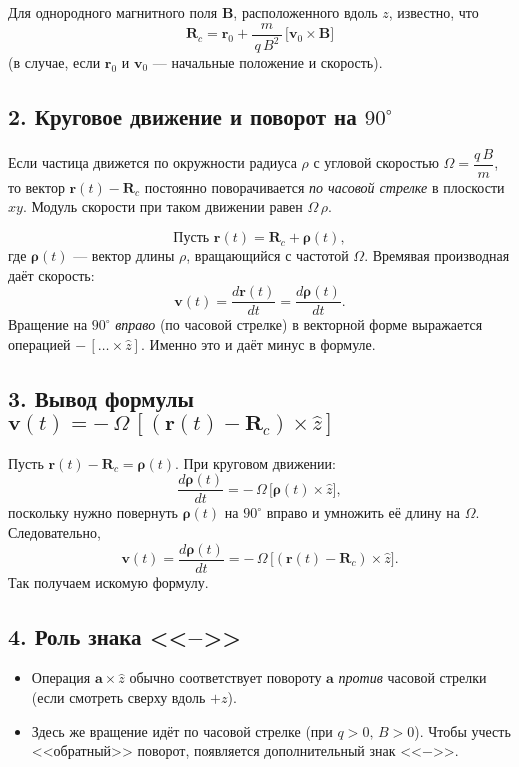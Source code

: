 \documentclass{article}
\begin{document}
Для однородного магнитного поля \(\mathbf{B}\), расположенного вдоль \(z\), известно, что
\[
\mathbf{R}_c
=
\mathbf{r}_0
+
\frac{m}{\,q\,B^2\,}\,\bigl[\mathbf{v}_0 \times \mathbf{B}\bigr]
\]
(в случае, если \(\mathbf{r}_0\) и \(\mathbf{v}_0\) --- начальные положение и скорость).

\subsection*{2. Круговое движение и поворот на \(90^\circ\)}

Если частица движется по окружности радиуса \(\rho\) с угловой скоростью \(\Omega = \dfrac{q\,B}{m}\), то вектор \(\mathbf{r}(t) - \mathbf{R}_c\) постоянно поворачивается \emph{по часовой стрелке} в плоскости \(xy\). Модуль скорости при таком движении равен \(\Omega\,\rho\).

\[
\text{Пусть } \mathbf{r}(t) = \mathbf{R}_c + \boldsymbol{\rho}(t),
\]
где \(\boldsymbol{\rho}(t)\) --- вектор длины \(\rho\), вращающийся с частотой \(\Omega\). Время\-вая производная даёт скорость:
\[
\mathbf{v}(t)
=
\frac{d\mathbf{r}(t)}{dt}
=
\frac{d\boldsymbol{\rho}(t)}{dt}.
\]
Вращение на \(90^\circ\) \emph{вправо} (по часовой стрелке) в векторной форме выражается операцией \(-\,[\dots \times \hat{z}]\). Именно это и даёт минус в формуле.

\subsection*{3. Вывод формулы \(\mathbf{v}(t)
=
-\,\Omega\,[(\mathbf{r}(t)-\mathbf{R}_c)\times \hat{z}]\)}

Пусть \(\mathbf{r}(t) - \mathbf{R}_c = \boldsymbol{\rho}(t)\). При круговом движении:
\[
\frac{d\boldsymbol{\rho}(t)}{dt}
=
-\,\Omega\,\bigl[\boldsymbol{\rho}(t)\times \hat{z}\bigr],
\]
поскольку нужно повернуть \(\boldsymbol{\rho}(t)\) на \(90^\circ\) вправо и умножить её длину на \(\Omega\). Следовательно,
\[
\mathbf{v}(t)
=
\frac{d\boldsymbol{\rho}(t)}{dt}
=
-\,\Omega\,\bigl[(\mathbf{r}(t) - \mathbf{R}_c)\times \hat{z}\bigr].
\]
Так получаем искомую формулу.

\subsection*{4. Роль знака <<\(-\)>>}

\begin{itemize}
  \item Операция \(\mathbf{a}\times \hat{z}\) обычно соответствует повороту \(\mathbf{a}\) \emph{против} часовой стрелки (если смотреть сверху вдоль \(+z\)).
  \item Здесь же вращение идёт по часовой стрелке (при \(q>0,\,B>0\)). Чтобы учесть <<обратный>> поворот, появляется дополнительный знак <<\(-\)>>.
\end{itemize}
\end{document}
